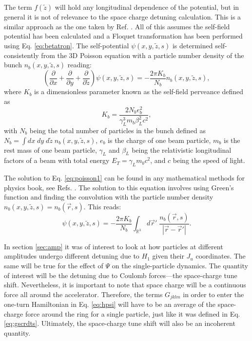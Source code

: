 The term $f(\tilde{z})$ will hold any longitudinal dependence of the potential, but in general it is not of relevance to the space charge detuning calculation. This is a similar approach as the one taken by Ref. \cite{scrdt_report}. All of this assumes the self-field potential has been calculated and a Floquet transformation has been performed using Eq. \ref{eq:betatron}. The self-potential $\psi(x,y,\tilde{z},s)$ is determined self-consistently from the 3D Poisson equation with a particle number density of the bunch $n_b(x,y,\tilde{z},s)$ reading:
\begin{equation}
    \label{eq:poisson1}
    \left( \frac{\partial}{\partial x}+\frac{\partial}{\partial y}+\frac{\partial}{\partial \tilde{z}}\right)\psi (x,y,\tilde{z},s)=-\frac{2 \pi K_b}{N_b}n_b(x,y,\tilde{z},s), 
\end{equation}
where $K_b$ is a dimensionless parameter known as the self-field perveance defined as
\begin{equation}
    \label{eq:perv}
    K_b = \frac{2 N_b e_b^2}{\gamma _L^3 m_b \beta_L^2 c^2},
\end{equation}
with $N_b$ being the total number of particles in the bunch defined as $N_b=\int dx \; dy \; d\tilde{z} \; n_b(x,y,\tilde{z},s)$, $e_b$ is the charge of one beam particle, $m_b$ is the rest mass of one beam particle, $\gamma_L$ and $\beta_L$ being the relativistic longitudinal factors of a beam with total energy $E_T=\gamma_L m_b c^2$, and $c$ being the speed of light.

The solution to Eq. \ref{eq:poisson1} can be found in any mathematical methods for physics book, see Refs. \cite{arfken,tellez}. The solution to this equation involves using Green's function and finding the convolution with the particle number density $n_b(x,y,\tilde{z},s)=n_b(\vec{r},s)$. This reads:
\begin{equation}
    \label{eq:greens1}
    \psi(x,y,\tilde{z},s)=-\frac{2 \pi K_b}{N_b} \int_{\mathbb{R}^3} d\vec{r}' \; \frac{n_b(\vec{r},s)}{\left| \vec{r}-\vec{r}' \right|}.
\end{equation} 
 
In section \ref{sec:amp} it was of interest to look at how particles at different amplitudes undergo different detuning due to $H_1$ given their $J_u$ coordinates. The same will be true for the effect of $\Psi$ on the single-particle dynamics. The quantity of interest will be the detuning due to Coulomb forces---the space-charge tune shift. Nevertheless, it is important to note that space charge will be a continuous force all around the accelerator. Therefore, the terms $G_{jklm}$ in order to enter the one-turn Hamiltonian in Eq. \ref{eq:hpsi} will have to be an average of the space-charge force around the ring for a single particle, just like it was defined in Eq. \ref{eq:gscrdts}. Ultimately, the space-charge tune shift will also be an incoherent quantity.

